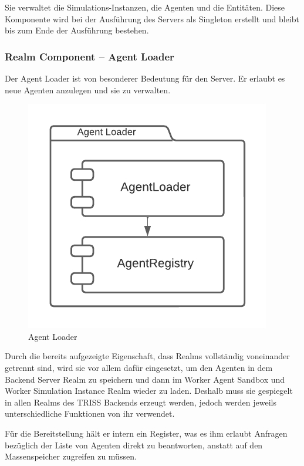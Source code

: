 \FloatBarrier

Sie verwaltet die Simulations-Instanzen, die Agenten und die Entitäten.
Diese Komponente wird bei der Ausführung des Servers als Singleton erstellt und bleibt bis zum Ende der Ausführung bestehen.

\subsubsection{Realm Component – Agent Loader}

Der Agent Loader ist von besonderer Bedeutung für den Server.
Er erlaubt es neue Agenten anzulegen und sie zu verwalten.

\begin{figure}[htb]
    \centering
    \includegraphics[scale=.65,center]{medien/agent-loader.pdf}
    \caption{Agent Loader}
    \ownsource
    \label{fig:agent-loader}
\end{figure}

\FloatBarrier

Durch die bereits aufgezeigte Eigenschaft, dass Realms vollständig voneinander getrennt sind, wird sie vor allem dafür eingesetzt, um den Agenten in dem Backend Server Realm zu speichern und dann im Worker Agent Sandbox und Worker Simulation Instance Realm wieder zu laden.
Deshalb muss sie gespiegelt in allen Realms des TRISS Backends erzeugt werden, jedoch werden jeweils unterschiedliche Funktionen von ihr verwendet.

Für die Bereitstellung hält er intern ein Register, was es ihm erlaubt Anfragen bezüglich der Liste von Agenten direkt zu beantworten, anstatt auf den Massenspeicher zugreifen zu müssen.

